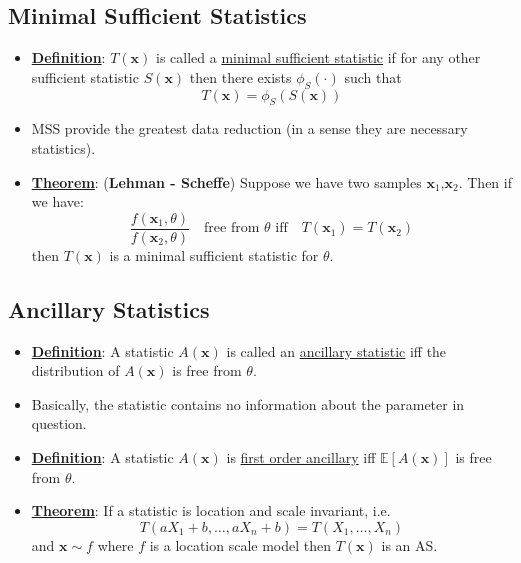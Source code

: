 \documentclass{article}
\newcommand{\E}{{\mathbb{E}}}
\newcommand{\x}{{\textbf{x}}}
\begin{document}
\subsection{Minimal Sufficient Statistics}

\begin{itemize}
\item \underline{\textbf{Definition}}: $T(\x)$ is called a \underline{minimal sufficient statistic} if for any other sufficient statistic $S(\x)$ then there exists $\phi_S(\cdot)$ such that $$T(\x) = \phi_S(S(\x))$$
\item MSS provide the greatest data reduction (in a sense they are necessary statistics). 
\item \underline{\textbf{Theorem}}: (\textbf{Lehman - Scheffe}) Suppose we have two samples $\x_1$,$\x_2$. Then if we have: $$\frac{f(\x_1, \theta)}{f(\x_2,\theta)} \hspace{1em}\text{free from $\theta$ iff}\hspace{1em} T(\x_1) = T(\x_2)$$ then $T(\x)$ is a minimal sufficient statistic for $\theta$. 
\end{itemize}

\subsection{Ancillary Statistics}
\begin{itemize}
\item \underline{\textbf{Definition}}: A statistic $A(\x)$ is called an \underline{ancillary statistic} iff the distribution of $A(\x)$ is free from $\theta$. 
\item Basically, the statistic contains no information about the parameter in question. 
\item \underline{\textbf{Definition}}: A statistic $A(\x)$ is \underline{first order ancillary} iff $\E[A(\x)]$ is free from $\theta$. 
\item \underline{\textbf{Theorem}}: If a statistic is location and scale invariant, i.e. $$T(aX_1 + b, \ldots, aX_n + b) = T(X_1, \ldots, X_n)$$ and $\x\sim f$ where $f$ is a location scale model then $T(\x)$ is an AS. 
\end{itemize}
\end{document}
